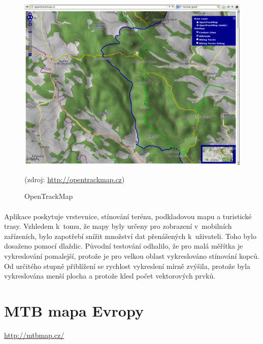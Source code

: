 \documentclass[11pt,a4paper,titlepage,oneside]{book}
\begin{document}
		\begin{figure}[!h]
			\begin{center}
				\includegraphics[width=12cm]{obrazky/otm.png}
				\caption{OpenTrackMap}
				(zdroj: \url{http://opentrackmap.cz})
			\end{center}
		\end{figure}



		\paragraph{}  Aplikace poskytuje vrstevnice, stínování terénu, podkladovou mapu a turistické trasy. Vzhledem k~tomu, že mapy byly určeny pro zobrazení v~mobilních zařízeních, bylo zapotřebí snížit množství dat přenášených k~uživateli. Toho bylo dosaženo pomocí dlaždic. Původní testování odhalilo, že pro malá měřítka je vykreslování pomalejší, protože je pro velkou oblast vykreslováno stínování kopců\cite{OTM}. Od určitého stupně přiblížení se rychlost vykreslení mírně zvýšila, protože byla vykreslována menší plocha a protože klesl počet vektorových prvků.

	\section{MTB mapa Evropy}
		\label{sec:MTB}
		\url{http://mtbmap.cz/}
\end{document}
